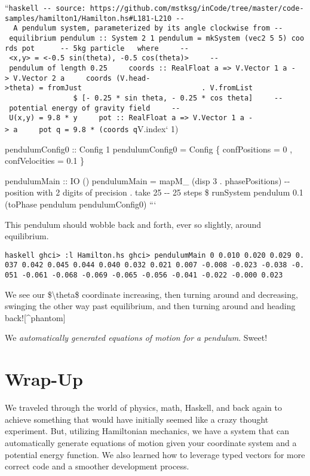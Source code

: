 \documentclass[]{article}
\begin{document}
``\texttt{haskell\ -\/-\ source:\ https://github.com/mstksg/inCode/tree/master/code-samples/hamilton1/Hamilton.hs\#L181-L210\ -\/-\ \textbar{}\ A\ pendulum\ system,\ parameterized\ by\ its\ angle\ clockwise\ from\ -\/-\ equilibrium\ pendulum\ ::\ System\ 2\ 1\ pendulum\ =\ mkSystem\ (vec2\ 5\ 5)\ coords\ pot\ \ \ \ \ \ -\/-\ 5kg\ particle\ \ \ where\ \ \ \ \ -\/-\ \textless{}x,y\textgreater{}\ =\ \textless{}-0.5\ sin(theta),\ -0.5\ cos(theta)\textgreater{}\ \ \ \ \ -\/-\ pendulum\ of\ length\ 0.25\ \ \ \ \ coords\ ::\ RealFloat\ a\ =\textgreater{}\ V.Vector\ 1\ a\ -\textgreater{}\ V.Vector\ 2\ a\ \ \ \ \ coords\ (V.head-\textgreater{}theta)\ =\ fromJust\ \ \ \ \ \ \ \ \ \ \ \ \ \ \ \ \ \ \ \ \ \ \ \ \ \ \ \ .\ V.fromList\ \ \ \ \ \ \ \ \ \ \ \ \ \ \ \ \ \ \ \ \ \ \ \ \ \ \ \ \$\ {[}-\ 0.25\ *\ sin\ theta,\ -\ 0.25\ *\ cos\ theta{]}\ \ \ \ \ -\/-\ potential\ energy\ of\ gravity\ field\ \ \ \ \ -\/-\ U(x,y)\ =\ 9.8\ *\ y\ \ \ \ \ pot\ ::\ RealFloat\ a\ =\textgreater{}\ V.Vector\ 1\ a\ -\textgreater{}\ a\ \ \ \ \ pot\ q\ =\ 9.8\ *\ (coords\ q}V.index`
1)

pendulumConfig0 :: Config 1 pendulumConfig0 = Config \{ confPositions = 0 ,
confVelocities = 0.1 \}

pendulumMain :: IO () pendulumMain = mapM\_ (disp 3 . phasePositions) -\/-
position with 2 digits of precision . take 25 -\/- 25 steps \$ runSystem
pendulum 0.1 (toPhase pendulum pendulumConfig0) ```

This pendulum should wobble back and forth, ever so slightly, around
equilibrium.

\texttt{haskell\ ghci\textgreater{}\ :l\ Hamilton.hs\ ghci\textgreater{}\ pendulumMain\ 0\ 0.010\ 0.020\ 0.029\ 0.037\ 0.042\ 0.045\ 0.044\ 0.040\ 0.032\ 0.021\ 0.007\ -0.008\ -0.023\ -0.038\ -0.051\ -0.061\ -0.068\ -0.069\ -0.065\ -0.056\ -0.041\ -0.022\ -0.000\ 0.023}

We see our \$\textbackslash{}theta\$ coordinate increasing, then turning around
and decreasing, swinging the other way past equilibrium, and then turning around
and heading back!{[}\^{}phantom{]}

We \emph{automatically generated equations of motion for a pendulum}. Sweet!

\section{Wrap-Up}

We traveled through the world of physics, math, Haskell, and back again to
achieve something that would have initially seemed like a crazy thought
experiment. But, utilizing Hamiltonian mechanics, we have a system that can
automatically generate equations of motion given your coordinate system and a
potential energy function. We also learned how to leverage typed vectors for
more correct code and a smoother development process.
\end{document}
